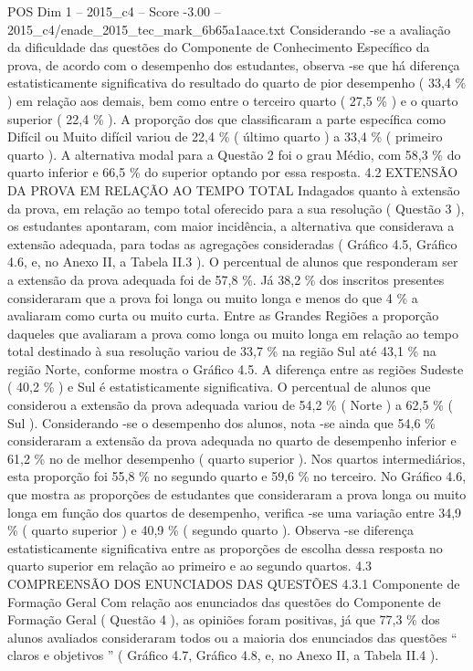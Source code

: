 \begin{textsample}{POS Dim 1 – 2015\_c4 – Score -3.00 – 2015\_c4/enade\_2015\_tec\_mark\_6b65a1aace.txt}
Considerando -se a avaliação da dificuldade das questões do Componente de Conhecimento Específico da prova, de acordo com o desempenho dos estudantes, observa -se que há diferença estatisticamente significativa do resultado do quarto de pior desempenho ( 33,4 \% ) em relação aos demais, bem como entre o terceiro quarto ( 27,5 \% ) e o quarto superior ( 22,4 \% ).
A proporção dos que classificaram a parte específica como Difícil ou Muito difícil variou de 22,4 \% ( último quarto ) a 33,4 \% ( primeiro quarto ).
A alternativa modal para a Questão 2 foi o grau Médio, com 58,3 \% do quarto inferior e 66,5 \% do superior optando por essa resposta. 4.2 EXTENSÃO DA PROVA EM RELAÇÃO AO TEMPO TOTAL Indagados quanto à extensão da prova, em relação ao tempo total oferecido para a sua resolução ( Questão 3 ), os estudantes apontaram, com maior incidência, a alternativa que considerava a extensão adequada, para todas as agregações consideradas ( Gráfico 4.5, Gráfico 4.6, e, no Anexo II, a Tabela II.3 ).
O percentual de alunos que responderam ser a extensão da prova adequada foi de 57,8 \%.
Já 38,2 \% dos inscritos presentes consideraram que a prova foi longa ou muito longa e menos do que 4 \% a avaliaram como curta ou muito curta.
Entre as Grandes Regiões a proporção daqueles que avaliaram a prova como longa ou muito longa em relação ao tempo total destinado à sua resolução variou de 33,7 \% na região Sul até 43,1 \% na região Norte, conforme mostra o Gráfico 4.5.
A diferença entre as regiões Sudeste ( 40,2 \% ) e Sul é estatisticamente significativa.
O percentual de alunos que considerou a extensão da prova adequada variou de 54,2 \% ( Norte ) a 62,5 \% ( Sul ).
Considerando -se o desempenho dos alunos, nota -se ainda que 54,6 \% consideraram a extensão da prova adequada no quarto de desempenho inferior e 61,2 \% no de melhor desempenho ( quarto superior ).
Nos quartos intermediários, esta proporção foi 55,8 \% no segundo quarto e 59,6 \% no terceiro.
No Gráfico 4.6, que mostra as proporções de estudantes que consideraram a prova longa ou muito longa em função dos quartos de desempenho, verifica -se uma variação entre 34,9 \% ( quarto superior ) e 40,9 \% ( segundo quarto ).
Observa -se diferença estatisticamente significativa entre as proporções de escolha dessa resposta no quarto superior em relação ao primeiro e ao segundo quartos. 4.3 COMPREENSÃO DOS ENUNCIADOS DAS QUESTÕES 4.3.1 Componente de Formação Geral Com relação aos enunciados das questões do Componente de Formação Geral ( Questão 4 ), as opiniões foram positivas, já que 77,3 \% dos alunos avaliados consideraram todos ou a maioria dos enunciados das questões “ claros e objetivos ” ( Gráfico 4.7, Gráfico 4.8, e, no Anexo II, a Tabela II.4 ).

\end{textsample}
